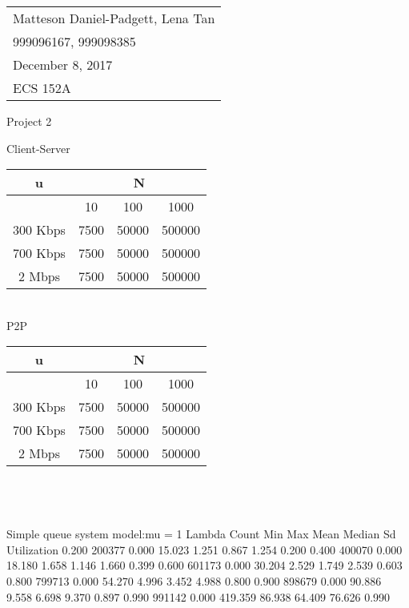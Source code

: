 \documentclass{article}
\begin{document}
	\null\hfill\begin{tabular}[t]{l@{}}
	Matteson Daniel-Padgett, Lena Tan\\
	999096167, 999098385\\
	December 8, 2017\\
	ECS 152A
\end{tabular}
	
\begin{center}	
\sc \Large Project 2
\end{center}	

\noindent Client-Server\\
\begin{tabular}{|c | c | c | c|}
	\hline
	u & \multicolumn{3}{|c|}{N} \\
	\hline
	 & 10 & 100 & 1000 \\
	\hline
	300 Kbps & 7500 & 50000 & 500000 \\
	\hline
	700 Kbps & 7500 & 50000 & 500000 \\
	\hline
	2 Mbps & 7500 & 50000 & 500000 \\
	\hline
\end{tabular} \\

\noindent P2P\\
\begin{tabular}{|c | c | c | c|}
	\hline
	u & \multicolumn{3}{|c|}{N} \\
	\hline
	& 10 & 100 & 1000 \\
	\hline
	300 Kbps & 7500 & 50000 & 500000 \\
	\hline
	700 Kbps & 7500 & 50000 & 500000 \\
	\hline
	2 Mbps & 7500 & 50000 & 500000 \\
	\hline
\end{tabular} \\

\part{}	
	
\section{}
Simple queue system model:mu = 1
Lambda    Count     Min       Max       Mean      Median    Sd        Utilization
0.200     200377    0.000     15.023    1.251     0.867     1.254     0.200    
0.400     400070    0.000     18.180    1.658     1.146     1.660     0.399    
0.600     601173    0.000     30.204    2.529     1.749     2.539     0.603    
0.800     799713    0.000     54.270    4.996     3.452     4.988     0.800    
0.900     898679    0.000     90.886    9.558     6.698     9.370     0.897    
0.990     991142    0.000     419.359   86.938    64.409    76.626    0.990    
\end{document}
